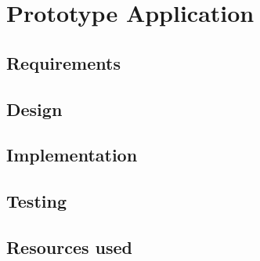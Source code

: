 \chapter{Prototype Application}
\label{prototype}

\section{Requirements}

\section{Design}

\section{Implementation}

\section{Testing}

\section{Resources used}